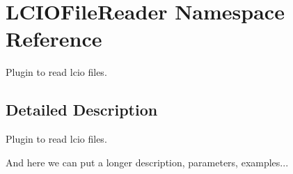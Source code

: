 \hypertarget{namespace_l_c_i_o_file_reader}{}\section{L\+C\+I\+O\+File\+Reader Namespace Reference}
\label{namespace_l_c_i_o_file_reader}


Plugin to read lcio files.  




\subsection{Detailed Description}
Plugin to read lcio files. 

And here we can put a longer description, parameters, examples... 